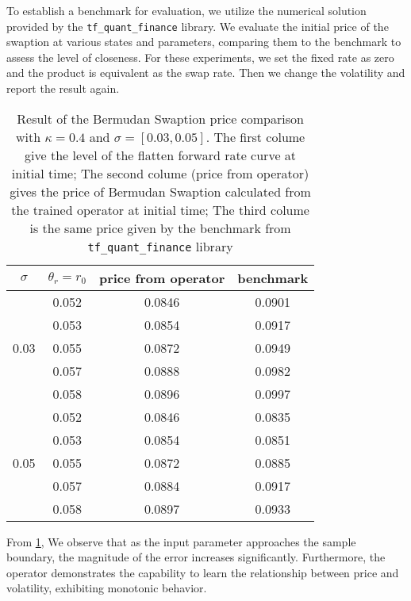 \documentclass[11pt,a4paper]{article}
\theoremstyle{remark}
\begin{document}
	
	To establish a benchmark for evaluation, we utilize the numerical solution provided by the \texttt{tf\_quant\_finance} library. We evaluate the initial price of the swaption at various states and parameters, comparing them to the benchmark to assess the level of closeness. For these experiments, we set the fixed rate as zero and the product is equivalent as the swap rate. Then we change the volatility and report the result again.
	\begin{table}[htbp]
		\centering
		\begin{tabular}{cccc}
			\hline
			$\sigma$&$\theta_r = r_0$  & price from operator & benchmark \\
			\hline
			\multirow{5}{*}{0.03} &0.052 & 0.0846  & 0.0901 \\
			&0.053 & 0.0854  & 0.0917 \\
			&0.055 & 0.0872  & 0.0949 \\
			&0.057 & 0.0888  & 0.0982 \\
			&0.058 & 0.0896  & 0.0997 \\
			\hline  
			\multirow{5}{*}{0.05} & 0.052 & 0.0846  & 0.0835 \\
			&0.053 & 0.0854  & 0.0851 \\
			&0.055 & 0.0872  & 0.0885 \\
			&0.057 & 0.0884  & 0.0917 \\
			&0.058 & 0.0897  & 0.0933 \\
			\hline
			
		\end{tabular}
		\caption{Result of the Bermudan Swaption price comparison with $\kappa=0.4$ and $\sigma=[0.03, 0.05]$. The first colume give the level of the flatten forward rate curve at initial time; The second colume (price from operator) gives the price of Bermudan Swaption calculated from the trained operator at initial time; The third colume is the same price given by the benchmark from \texttt{tf\_quant\_finance} library}
		\label{tab:BSwaption1}
	\end{table}
	From \ref{tab:BSwaption1}, We observe that as the input parameter approaches the sample boundary, the magnitude of the error increases significantly. Furthermore, the operator demonstrates the capability to learn the relationship between price and volatility, exhibiting monotonic behavior. 
	
\end{document}
